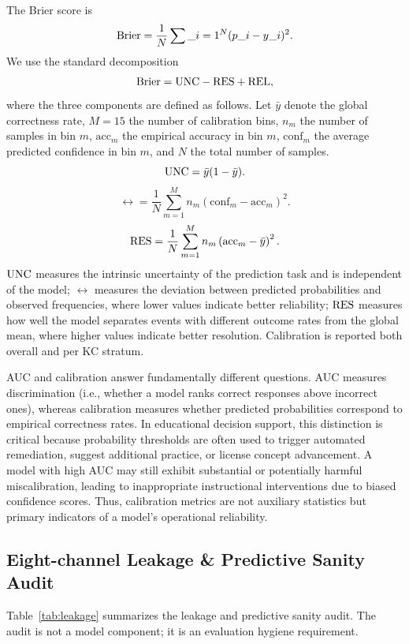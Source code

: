The Brier score is
\begin{equation}
\mathrm{Brier} = \frac{1}{N}\sum\_{i=1}^{N}(p\_i-y\_i)^2.
\end{equation}
We use the standard decomposition
\begin{equation}
\mathrm{Brier} = \mathrm{UNC} - \mathrm{RES} + \mathrm{REL},
\end{equation}
where the three components are defined as follows. Let $\bar{y}$ denote the global correctness rate, $M=15$ the number of calibration bins, $n_m$ the number of samples in bin $m$, $\mathrm{acc}_m$ the empirical accuracy in bin $m$, $\mathrm{conf}_m$ the average predicted confidence in bin $m$, and $N$ the total number of samples.
\begin{equation}
\mathrm{UNC} = \bar{y}(1-\bar{y}).
\end{equation}
\begin{equation}
\rel = \frac{1}{N}\sum_{m=1}^{M} n_m
\left(\mathrm{conf}_m - \mathrm{acc}_m\right)^2.
\end{equation}
\begin{equation}
\mathrm{RES} = \frac{1}{N}\sum_{m=1}^{M} n_m
\left(\mathrm{acc}_m - \bar{y}\right)^2.
\end{equation}
$\mathrm{UNC}$ measures the intrinsic uncertainty of the prediction task and is independent of the model; $\rel$ measures the deviation between predicted probabilities and observed frequencies, where lower values indicate better reliability; $\mathrm{RES}$ measures how well the model separates events with different outcome rates from the global mean, where higher values indicate better resolution.
Calibration is reported both overall and per KC stratum.

AUC and calibration answer fundamentally different questions. AUC measures discrimination (i.e., whether a model ranks correct responses above incorrect ones), whereas calibration measures whether predicted probabilities correspond to empirical correctness rates. In educational decision support, this distinction is critical because probability thresholds are often used to trigger automated remediation, suggest additional practice, or license concept advancement. A model with high AUC may still exhibit substantial or potentially harmful miscalibration, leading to inappropriate instructional interventions due to biased confidence scores. Thus, calibration metrics are not auxiliary statistics but primary indicators of a model's operational reliability.

\subsection{Eight-channel Leakage \& Predictive Sanity Audit}
Table~\ref{tab:leakage} summarizes the leakage and predictive sanity audit. The audit is not a model component; it is an evaluation hygiene requirement.

